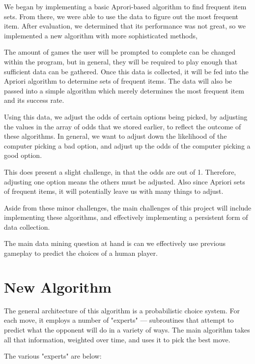We began by implementing a basic Aprori-based algorithm to find frequent item
sets. From there, we were able to use the data to figure out the most frequent
item. After evaluation, we determined that its performance was not great, so we
implemented a new algorithm with more sophisticated methods,



The amount of games the user will be prompted to complete can be changed within
the program, but in general, they will be required to play enough that
sufficient data can be gathered. Once this data is collected, it will be fed
into the Apriori algorithm to determine sets of frequent items. The data will
also be passed into a simple algorithm which merely determines the most frequent
item and its success rate.

Using this data, we adjust the odds of certain options being picked, by
adjusting the values in the array of odds that we stored earlier, to reflect the
outcome of these algorithms. In general, we want to adjust down the likelihood
of the computer picking a bad option, and adjust up the odds of the computer
picking a good option.

This does present a slight challenge, in that the odds are out of 1. Therefore,
adjusting one option means the others must be adjusted. Also since Apriori sets
of frequent items, it will potentially leave us with many things to adjust.

Aside from these minor challenges, the main challenges of this project will
include implementing these algorithms, and effectively implementing a persistent
form of data collection.

The main data mining question at hand is can we effectively use previous
gameplay to predict the choices of a human player.


\section{New Algorithm}

The general architecture of this algorithm is a probabilistic choice system. For
each move, it employs a number of "experts" --- subroutines that attempt to
predict what the opponent will do in a variety of ways. The main algorithm takes
all that information, weighted over time, and uses it to pick the best move.

The various "experts" are below:

